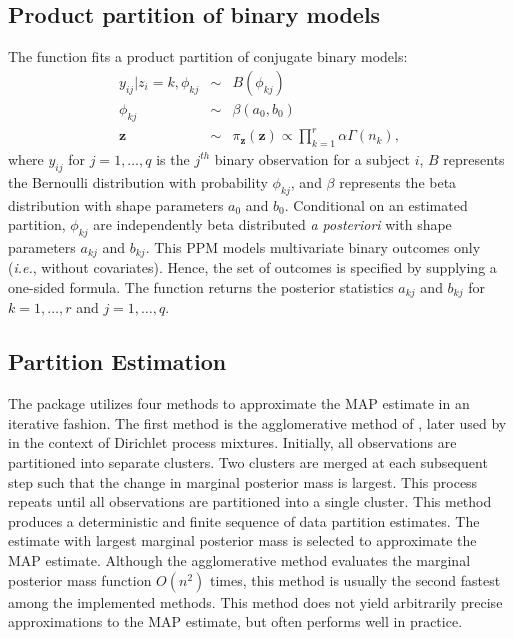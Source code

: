 \documentclass[article, nojss]{jss}
\newcommand{\bz}{\boldsymbol{z}}
\begin{document}
\subsection{Product partition of binary models}

The  function fits a product partition of conjugate binary models:
\begin{eqnarray}
y_{ij} | z_i = k, \phi_{kj} & \sim & B(\phi_{kj}) \nonumber \\
\phi_{kj} & \sim & \beta(a_0, b_0) \nonumber \\
\bz & \sim & \pi_{\bz}(\bz) \propto \prod_{k=1}^r \alpha \Gamma(n_k),
\end{eqnarray}
where $y_{ij}$ for $j = 1,\ldots,q$ is the $j^{th}$ binary observation for a subject $i$, $B$ represents the Bernoulli distribution with probability $\phi_{kj}$, and $\beta$ represents the beta distribution with shape parameters $a_0$ and $b_0$. Conditional on an estimated partition, $\phi_{kj}$ are independently beta distributed {\it a posteriori} with shape parameters $a_{kj}$ and $b_{kj}$. This PPM models multivariate binary outcomes only ({\it i.e.}, without covariates). Hence, the set of outcomes is specified by supplying a one-sided  formula. The  function returns the posterior statistics $a_{kj}$ and $b_{kj}$ for $k=1,\ldots,r$ and $j=1,\ldots,q$.


\subsection[Estimation]{Partition Estimation} \label{Estimation}
The  package utilizes four methods to approximate the MAP estimate in an iterative fashion. The first method is the agglomerative method of \citet{Ward1963}, later used by \citet{Heard2005} in the context of Dirichlet process mixtures. Initially, all observations are partitioned into separate clusters. Two clusters are merged at each subsequent step such that the change in marginal posterior mass is largest. This process repeats until all observations are partitioned into a single cluster. This method produces a deterministic and finite sequence of data partition estimates. The estimate with largest marginal posterior mass is selected to approximate the MAP estimate. Although the agglomerative method evaluates the marginal posterior mass function $O(n^2)$ times, this method is usually the second fastest among the implemented methods. This method does not yield arbitrarily precise approximations to the MAP estimate, but often performs well in practice.
\end{document}
